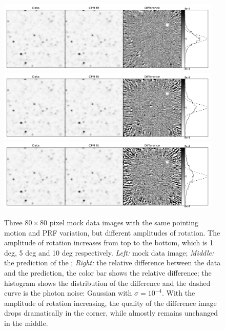 \begin{figure}[p]
\begin{center}
\includegraphics[width=0.95\textwidth]{figures/cdi/f8a}
\includegraphics[width=0.95\textwidth]{figures/cdi/f8b}
\includegraphics[width=0.95\textwidth]{figures/cdi/f8c}
\end{center}
\caption{
  \label{large_rotation}
  Three $80\times 80$ pixel mock data images with the same pointing motion and PRF variation, but different amplitudes of rotation. The amplitude of rotation increases from top to the bottom, which is 1 deg, 5 deg and 10 deg respectively.
  \emph{Left:} mock data image;
  \emph{Middle:} the prediction of the \cpmdiff;
  \emph{Right:} the relative difference between the data and the prediction, the color bar shows the relative difference; the histogram shows the distribution of the difference and the dashed curve is the photon noise: Gaussian with $\sigma = 10^{-4}$. 
  With the amplitude of rotation increasing, the quality of the difference image drops dramatically in the corner, while almostly remains unchanged in the middle.
}
\end{figure}

